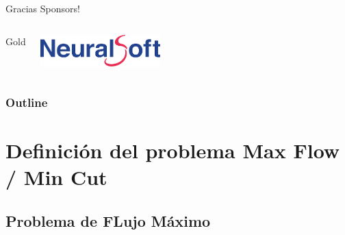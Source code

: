 \documentclass{beamer}
\begin{document}
\begin{frame}{Gracias Sponsors!}
    \begin{columns}[t]
        \centering
        Gold\\
        \begin{minipage}{0.5\textwidth}
            \centering
            \includegraphics[width=0.4\textwidth,keepaspectratio]{logos/neuralsoft.png}
        \end{minipage}%
        \begin{minipage}{0.5\textwidth}
            \centering
        \end{minipage}
    \end{columns}
\end{frame}


\begin{frame}
\frametitle{Outline}
\tableofcontents
\end{frame}


\section{Definición del problema Max Flow / Min Cut}
    \subsection{Problema de FLujo Máximo}
\end{document}
